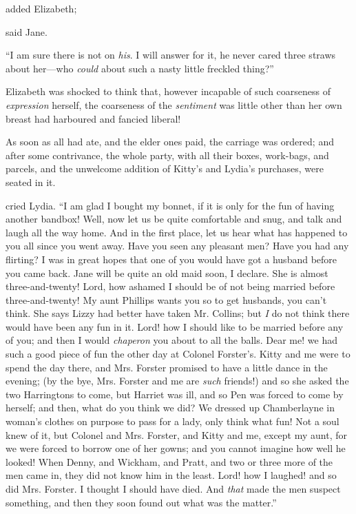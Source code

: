  added Elizabeth; 


 said Jane.

“I am sure there is not on {\em his}. I will answer for it, he never cared three straws about her---who {\em could} about such a nasty little freckled thing?”

Elizabeth was shocked to think that, however incapable of such coarseness of {\em expression} herself, the coarseness of the {\em sentiment} was little other than her own breast had harboured and fancied liberal!

As soon as all had ate, and the elder ones paid, the carriage was ordered; and after some contrivance, the whole party, with all their boxes, work-bags, and parcels, and the unwelcome addition of Kitty's and Lydia's purchases, were seated in it.

 cried Lydia. “I am glad I bought my bonnet, if it is only for the fun of having another bandbox! Well, now let us be quite comfortable and snug, and talk and laugh all the way home. And in the first place, let us hear what has happened to you all since you went away. Have you seen any pleasant men? Have you had any flirting? I was in great hopes that one of you would have got a husband before you came back. Jane will be quite an old maid soon, I declare. She is almost three-and-twenty! Lord, how ashamed I should be of not being married before three-and-twenty! My aunt Phillips wants you so to get husbands, you can't think. She says Lizzy had better have taken Mr. Collins; but {\em I} do not think there would have been any fun in it. Lord! how I should like to be married before any of you; and then I would {\em chaperon} you about to all the balls. Dear me! we had such a good piece of fun the other day at Colonel Forster's. Kitty and me were to spend the day there, and Mrs. Forster promised to have a little dance in the evening; (by the bye, Mrs. Forster and me are {\em such} friends!) and so she asked the two Harringtons to come, but Harriet was ill, and so Pen was forced to come by herself; and then, what do you think we did? We dressed up Chamberlayne in woman's clothes on purpose to pass for a lady, only think what fun! Not a soul knew of it, but Colonel and Mrs. Forster, and Kitty and me, except my aunt, for we were forced to borrow one of her gowns; and you cannot imagine how well he looked! When Denny, and Wickham, and Pratt, and two or three more of the men came in, they did not know him in the least. Lord! how I laughed! and so did Mrs. Forster. I thought I should have died. And {\em that} made the men suspect something, and then they soon found out what was the matter.”

